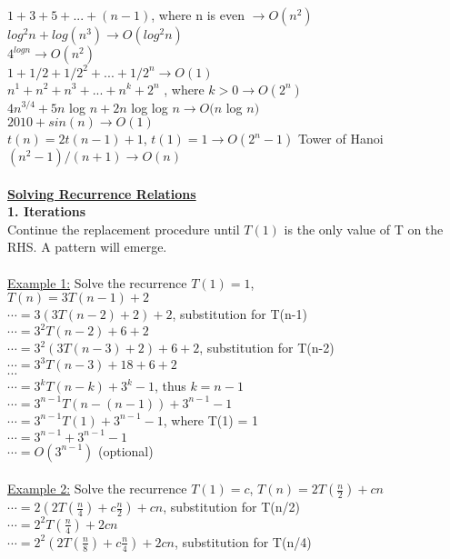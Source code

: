 \documentclass[8pt,letterpaper,twocolumn]{article}
\begin{document}
$1 + 3 + 5 + ... + (n-1)$, where n is even $\rightarrow O(n^2)$\\
$log^2n + log(n^3) \rightarrow O(log^2n)$\\
$4^{log n} \rightarrow O(n^2)$\\
$1 + 1/2 + 1/2^2 + ... + 1/2^n \rightarrow O(1)$\\
$n^1 + n^2 + n^3 + ... + n^k + 2^n$ , where $k > 0 \rightarrow O(2^n)$\\
$4n^{3/4} + 5n$ log $n + 2n$ log log $n \rightarrow O(n$ log $n)$\\
$2010 + sin(n) \rightarrow O(1)$\\
$t(n) = 2t(n-1) + 1$, $t(1) = 1 \rightarrow O(2^n - 1)$ Tower of Hanoi\\
$(n^2 - 1)/(n + 1) \rightarrow O(n)$\\
\\
\underline{\textbf{Solving Recurrence Relations}}\\
\textbf{1. Iterations}\\
Continue the replacement procedure until $T(1)$ is the only value of T on the RHS. A pattern will emerge.\\
\\
\underline{Example 1:} Solve the recurrence $T(1) = 1$,\\
$T(n)=3T(n-1)+ 2$\\
$\cdots=3(3T(n-2)+2)+2$, substitution for T(n-1)\\
$\cdots=3^2T(n-2)+6+2$\\
$\cdots=3^2(3T(n-3)+2)+6+2$, substitution for T(n-2)\\
$\cdots=3^3T(n-3)+18+6+2$ \\
$\cdots$\\
$\cdots=3^kT(n-k)+3^k-1$, thus $k=n-1$\\
$\cdots=3^{n-1}T(n-(n-1))+3^{n-1}-1$\\
$\cdots=3^{n-1}T(1)+3^{n-1}-1$, where T(1) = 1\\
$\cdots=3^{n-1} + 3^{n-1}-1$ \\
$\cdots=O(3^{n-1})$ (optional)\\
\\
\underline{Example 2:} Solve the recurrence $T(1)=c$, $T(n)=2T(\frac{n}{2})+cn$\\
$\cdots=2(2T(\frac{n}{4})+c\frac{n}{2})+cn$, substitution for T(n/2)\\
$\cdots=2^2T(\frac{n}{4})+2cn$\\
$\cdots=2^2(2T(\frac{n}{8})+c\frac{n}{4})+2cn$, substitution for T(n/4)\\
\end{document}
